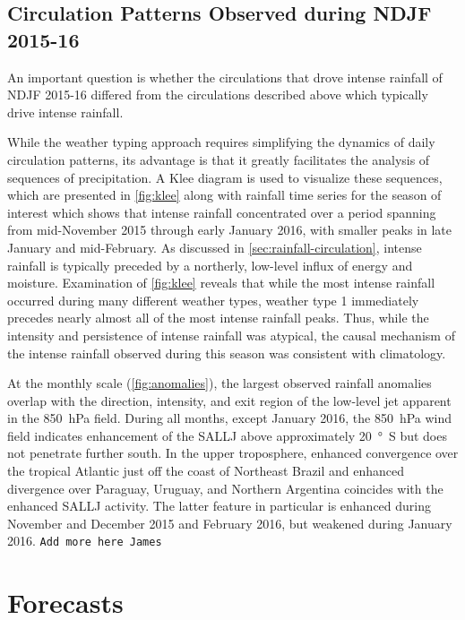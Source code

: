 \documentclass{ametsoc}
\begin{document}
\subsection{Circulation Patterns Observed during NDJF 2015-16}

An important question is whether the circulations that drove intense rainfall of NDJF 2015-16 differed from the circulations described above which typically drive intense rainfall.

While the weather typing approach requires simplifying the dynamics of daily circulation patterns, its advantage is that it greatly facilitates the analysis of sequences of precipitation.
A Klee diagram \citep{Munoz2015, Munoz2016} is used to visualize these sequences, which are presented in \cref{fig:klee} along with rainfall time series for the season of interest which shows that intense rainfall concentrated over a period spanning from mid-November 2015 through early January 2016, with smaller peaks in late January and mid-February.
As discussed in \cref{sec:rainfall-circulation}, intense rainfall is typically preceded by a northerly, low-level influx of energy and moisture.
Examination of \cref{fig:klee} reveals that while the most intense rainfall occurred during many different weather types, weather type 1 immediately precedes nearly almost all of the most intense rainfall peaks.
Thus, while the intensity and persistence of intense rainfall was atypical, the causal mechanism of the intense rainfall observed during this season was consistent with climatology.

At the monthly scale (\cref{fig:anomalies}), the largest observed rainfall anomalies overlap with the direction, intensity, and exit region of the low-level jet apparent in the \SI{850}{\hecto\pascal} field.
During all months, except January 2016, the \SI{850}{\hecto\pascal} wind field indicates enhancement of the SALLJ above approximately \SI{20}{\degree S} but does not penetrate further south.
In the upper troposphere, enhanced convergence over the tropical Atlantic just off the coast of Northeast Brazil and enhanced divergence over Paraguay, Uruguay, and Northern Argentina coincides with the enhanced SALLJ activity.
The latter feature in particular is enhanced during November and December 2015 and February 2016, but weakened during January 2016.
\texttt{Add more here James}

\section{Forecasts} \label{sec:fcsts}
\end{document}
